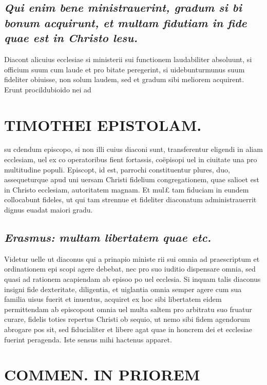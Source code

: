 \documentclass{article}
\begin{document}
\begin{pages}
\subsection*{\textit{Qui enim bene ministrauerint, gradum si bi bonum acquirunt, et multam fidutiam in fide quae est in Christo lesu. }}\pstart Diacont alicuius ecclesiae si ministerii sui functionem laudabiliter absoluunt, si officium suum cum laude et pro bitate peregerint, si uidebunturmunus suum fideliter obiuisse, non solum laudem, sed et gradum sibi meliorem acquirent. Erunt procildubioido nei ad  \pend
\section*{TIMOTHEI EPISTOLAM. }
\marginpar{[ p.87 ]}\pstart su cdendum episcopo, si non illi cuius diaconi sunt, transferentur eligendi in aliam ecclesiam, uel ex co operatoribus fient fortassis, coëpisopi uel in ciuitate una pro multitudine populi. Episcopt, id est, parrochi constituentur plures, duo, assequeturque apud uni uersam Christi fidelium congregationem, quae salioet est in Christo ecclesiam, autoritatem magnam. Et mul£ tam fiduciam in eundem collocabunt fideles, ut qui tam strennue et fideliter diaconatum administrauerrit dignus euadat maiori gradu.  \pend
{}
{}
\subsection*{\textit{Erasmus: multam libertatem quae etc. }}\pstart Videtur uelle ut diaconus qui a prinapio ministe rii sui omnia ad praescriptum et ordinationem epi scopi agere debebat, nec pro suo iuditio dispensare omnia, sed quasi ad rationem acapiendam ab episoo po uel ecclesia. Si inquam talis diaconus insigni fide dexteritate, diligentia, et uiglantia omnia semper agere cum sua familia uisus fuerit et inuentus, acquiret ex hoc sibi libertatem eidem permittendam ab episcopout omnia uel multa saltem pro arbitratu suo fruatur curare, fidelis toties repertus Christi ob sequio, ut nemo sibi fidem agendorum abrogare pos sit, sed fiducialiter et libere agat quae in honcrem dei et ecclesiae fuerint peragenda. Iste sensus mihi hactenus apparet.  \pend
\section*{COMMEN. IN PRIOREM }
\marginpar{[ p.88 ]}
{}

\end{pages}
\end{document}
